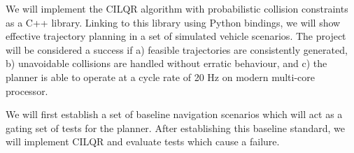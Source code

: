 \documentclass{article}
\theoremstyle{remark}
\theoremstyle{definition}
\begin{document}
We will implement the CILQR algorithm with probabilistic collision constraints as a C++ library. Linking to this library using Python bindings, we will show effective trajectory planning in a set of simulated vehicle scenarios. The project will be considered a success if a) feasible trajectories are consistently generated, b) unavoidable collisions are handled without erratic behaviour, and c) the planner is able to operate at a cycle rate of 20 Hz on modern multi-core processor.

We will first establish a set of baseline navigation scenarios which will act as a gating set of tests for the planner. After establishing this baseline standard, we will implement CILQR and evaluate tests which cause a failure.



\small
\end{document}
